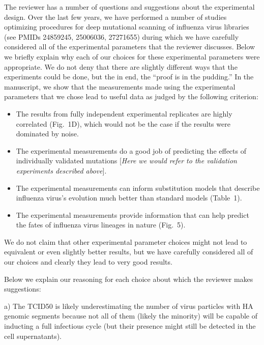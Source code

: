 \documentclass[11pt, oneside]{article}   	%
\newcommand{\comment}[1]{{\color{red}[\textsl{#1}]}}
\newcommand{\response}[1]{{\color{black}#1}}
\begin{document}
\response{The reviewer has a number of questions and suggestions about the experimental design.
Over the last few years, we have performed a number of studies optimizing procedures for deep mutational scanning of influenza virus libraries (see PMIDs 24859245, 25006036, 27271655) during which we have carefully considered all of the experimental parameters that the reviewer discusses.
Below we briefly explain why each of our choices for these experimental parameters were appropriate.
We do not deny that there are slightly different ways that the experiments could be done, but the in end, the ``proof is in the pudding.'' 
In the manuscript, we show that the measurements made using the experimental parameters that we chose lead to useful data as judged by the following criterion:
\begin{itemize}
\item The results from fully independent experimental replicates are highly correlated (Fig.~1D), which would not be the case if the results were dominated by noise.
\item The experimental measurements do a good job of predicting the effects of individually validated mutations \comment{Here we would refer to the validation experiments described above}.
\item The experimental measurements can inform substitution models that describe influenza virus's evolution much better than standard models (Table~1).
\item The experimental measurements provide information that can help predict the fates of influenza virus lineages in nature (Fig.~5).
\end{itemize}
We do not claim that other experimental parameter choices might not lead to equivalent or even slightly better results, but we have carefully considered all of our choices and clearly they lead to very good results.

Below we explain our reasoning for each choice about which the reviewer makes suggestions:
}

a) The TCID50 is likely underestimating the number of virus particles with HA genomic segments because not all of them (likely the minority) will be capable of inducting a full infectious cycle (but their presence might still be detected in the cell supernatants). 
\end{document}
